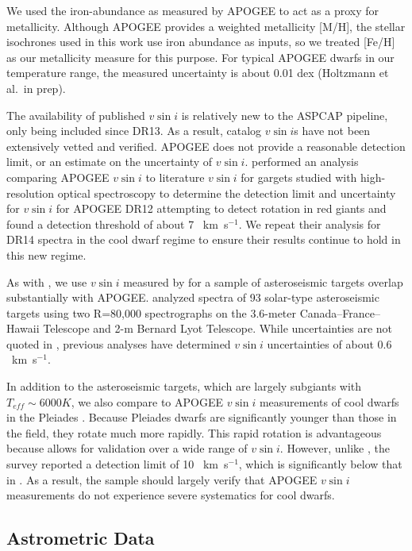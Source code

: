 \documentclass[manuscript]{aastex6}
\newcommand{\vsini}{\ensuremath{v \sin i}}
\newcommand{\Teff}{\ensuremath{T_{eff}}}
\newcommand{\kms}{\textrm{~km~s}\ensuremath{^{-1}}}
\begin{document}
We used the iron-abundance as measured by APOGEE to act as a proxy for
metallicity. Although APOGEE provides a weighted metallicity [M/H], the 
stellar isochrones used in this work use iron abundance as inputs, so we 
treated [Fe/H] as our metallicity measure for this purpose. For typical APOGEE 
dwarfs in our temperature range, the measured uncertainty is about 0.01
dex (Holtzmann et al.\ in prep).

The availability of published \vsini{} is relatively new to the ASPCAP pipeline, only
being included since DR13. As a result, catalog \vsini{}s have not been 
extensively vetted and verified. APOGEE does not provide a reasonable
detection limit, or an estimate on the uncertainty of \vsini{}. 
\citet{Tayar15} performed an analysis comparing APOGEE \vsini{} to literature
\vsini{} for gargets studied with high-resolution optical spectroscopy to 
determine the detection limit and
uncertainty for \vsini{} for APOGEE DR12 attempting to detect rotation in red
giants and found a detection threshold of about 7 \kms. We repeat their 
analysis for DR14 spectra in the cool dwarf regime to ensure their results
continue to hold in this new regime. 

As with \citep{Tayar15}, we use \vsini{} measured by \citet{Bruntt12} for a
sample of asteroseismic targets overlap substantially with APOGEE. 
\citet{Bruntt12} analyzed spectra of 93 solar-type asteroseismic targets using 
two R=80,000 spectrographs 
on the 3.6-meter Canada--France--Hawaii Telescope and 2-m Bernard Lyot
Telescope. While uncertainties are not quoted in \citet{Bruntt12},
previous analyses have determined \vsini{} uncertainties of about 0.6
\kms \citep{Bruntt10a,Bruntt10b}.

In addition to the asteroseismic targets, which are largely subgiants with
\(\Teff \sim 6000 K\), we also compare to APOGEE \vsini{} measurements of cool 
dwarfs in the Pleiades \citep{Stauffer87}. Because Pleiades dwarfs are 
significantly younger than those in the field,
they rotate much more rapidly. This rapid rotation is advantageous
because allows for validation over a wide range of \vsini{}. However, unlike 
\citet{Bruntt12}, the \citet{Stauffer87} survey 
reported a detection limit of 10 \kms, which is significantly below that in
\citet{Bruntt12}. As a result, the \citet{Stauffer87} sample should
largely verify that APOGEE \vsini{} measurements do not experience severe 
systematics for cool dwarfs.

\subsection{Astrometric Data}
\end{document}
